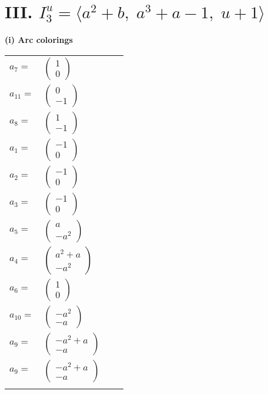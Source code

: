 \documentclass[1p]{elsarticle_modified}
\theoremstyle{definition}
\begin{document}
\centering \section*{III. $I^u_{3}= \langle a^2+b,\;a^3+a-1,\;u+1 \rangle$}
\flushleft \textbf{(i) Arc colorings}\\
\begin{tabular}{m{7pt} m{180pt} m{7pt} m{180pt} }
\flushright $a_{7}=$&$\begin{pmatrix}1\\0\end{pmatrix}$ \\
\flushright $a_{11}=$&$\begin{pmatrix}0\\-1\end{pmatrix}$ \\
\flushright $a_{8}=$&$\begin{pmatrix}1\\-1\end{pmatrix}$ \\
\flushright $a_{1}=$&$\begin{pmatrix}-1\\0\end{pmatrix}$ \\
\flushright $a_{2}=$&$\begin{pmatrix}-1\\0\end{pmatrix}$ \\
\flushright $a_{3}=$&$\begin{pmatrix}-1\\0\end{pmatrix}$ \\
\flushright $a_{5}=$&$\begin{pmatrix}a\\- a^2\end{pmatrix}$ \\
\flushright $a_{4}=$&$\begin{pmatrix}a^2+a\\- a^2\end{pmatrix}$ \\
\flushright $a_{6}=$&$\begin{pmatrix}1\\0\end{pmatrix}$ \\
\flushright $a_{10}=$&$\begin{pmatrix}- a^2\\- a\end{pmatrix}$ \\
\flushright $a_{9}=$&$\begin{pmatrix}- a^2+a\\- a\end{pmatrix}$\\ \flushright $a_{9}=$&$\begin{pmatrix}- a^2+a\\- a\end{pmatrix}$\\&\end{tabular}
\end{document}

